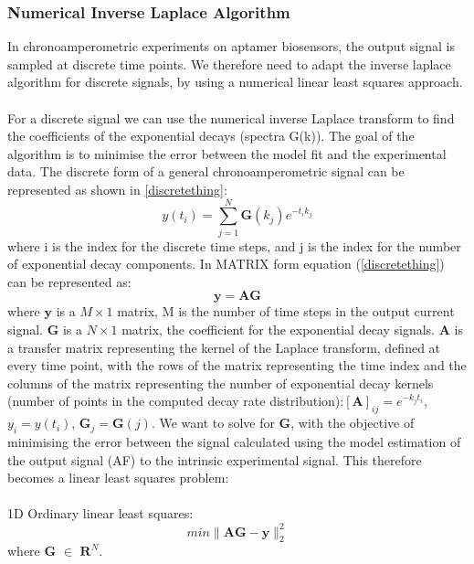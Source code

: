 \subsubsection{Numerical Inverse Laplace Algorithm}
In chronoamperometric experiments on aptamer biosensors, the output signal is sampled at discrete time points. We therefore need to adapt the inverse laplace algorithm for discrete signals, by using a numerical linear least squares approach.\\\\
For a discrete signal we can use the numerical inverse Laplace transform to find the coefficients of the exponential decays (spectra G(k)).
The goal of the algorithm is to minimise the error between the model fit and the experimental data.
The discrete form of a general chronoamperometric signal can be represented as shown in \autoref{discretething}:
\begin{equation}
    y(t_{i}) = \sum_{j=1}^{N} \mathbf{G}(k_{j})e^{-t_{i}k_{j}}
    \label{discretething}
\end{equation}
where i is the index for the discrete time steps, and j is the index for the number of exponential decay components. In MATRIX form equation (\autoref{discretething}) can be represented as:
$$ \mathbf{y = AG} $$
where $ \mathbf{y}$ is a $M\times 1$ matrix, M is the number of time steps in the output current signal. $\mathbf{G}$ is a $N\times 1$ matrix, the coefficient for the exponential decay signals. $\mathbf{A}$ is a transfer matrix representing the kernel of the Laplace
transform, defined at every time point, with the rows of the matrix representing the time index and the columns of the matrix representing the number of exponential decay kernels (number of points in the computed decay rate distribution):$ [\mathbf{A}]_{ij} = e^{-k_{j}t_{i}} $, $y_{i} = y(t_{i}) $, $\mathbf{G}_{j} = \mathbf{G}(j)$.
We want to solve for $\mathbf{G}$, with the objective of minimising the error between the signal calculated using the model estimation of the output signal (AF) to the intrinsic experimental signal. This therefore becomes a linear least squares problem:\\\\
1D Ordinary linear least squares:
\begin{equation}
    min\lVert \mathbf{AG} - \mathbf{y}\lVert^{2}_{2}
\end{equation}
where $\mathbf{G}$ $\in$ $\mathbf{R}^{N}$.\\\\

